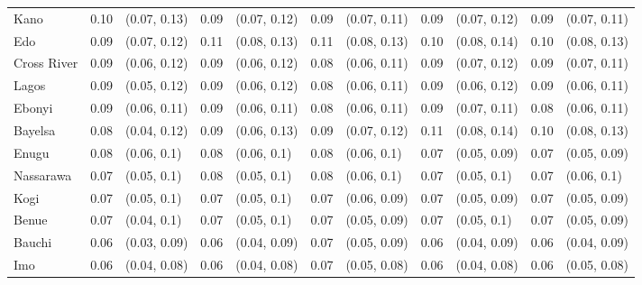 \begin{tabular}{lrlrlrlrlrl}
Kano & 0.10 & (0.07, 0.13) & 0.09 & (0.07, 0.12) & 0.09 & (0.07, 0.11) & 0.09 & (0.07, 0.12) & 0.09 & (0.07, 0.11)\\
Edo & 0.09 & (0.07, 0.12) & 0.11 & (0.08, 0.13) & 0.11 & (0.08, 0.13) & 0.10 & (0.08, 0.14) & 0.10 & (0.08, 0.13)\\
Cross River & 0.09 & (0.06, 0.12) & 0.09 & (0.06, 0.12) & 0.08 & (0.06, 0.11) & 0.09 & (0.07, 0.12) & 0.09 & (0.07, 0.11)\\
Lagos & 0.09 & (0.05, 0.12) & 0.09 & (0.06, 0.12) & 0.08 & (0.06, 0.11) & 0.09 & (0.06, 0.12) & 0.09 & (0.06, 0.11)\\
Ebonyi & 0.09 & (0.06, 0.11) & 0.09 & (0.06, 0.11) & 0.08 & (0.06, 0.11) & 0.09 & (0.07, 0.11) & 0.08 & (0.06, 0.11)\\
Bayelsa & 0.08 & (0.04, 0.12) & 0.09 & (0.06, 0.13) & 0.09 & (0.07, 0.12) & 0.11 & (0.08, 0.14) & 0.10 & (0.08, 0.13)\\
Enugu & 0.08 & (0.06, 0.1) & 0.08 & (0.06, 0.1) & 0.08 & (0.06, 0.1) & 0.07 & (0.05, 0.09) & 0.07 & (0.05, 0.09)\\
Nassarawa & 0.07 & (0.05, 0.1) & 0.08 & (0.05, 0.1) & 0.08 & (0.06, 0.1) & 0.07 & (0.05, 0.1) & 0.07 & (0.06, 0.1)\\
Kogi & 0.07 & (0.05, 0.1) & 0.07 & (0.05, 0.1) & 0.07 & (0.06, 0.09) & 0.07 & (0.05, 0.09) & 0.07 & (0.05, 0.09)\\
Benue & 0.07 & (0.04, 0.1) & 0.07 & (0.05, 0.1) & 0.07 & (0.05, 0.09) & 0.07 & (0.05, 0.1) & 0.07 & (0.05, 0.09)\\
Bauchi & 0.06 & (0.03, 0.09) & 0.06 & (0.04, 0.09) & 0.07 & (0.05, 0.09) & 0.06 & (0.04, 0.09) & 0.06 & (0.04, 0.09)\\
Imo & 0.06 & (0.04, 0.08) & 0.06 & (0.04, 0.08) & 0.07 & (0.05, 0.08) & 0.06 & (0.04, 0.08) & 0.06 & (0.05, 0.08)\\
\bottomrule
\end{tabular}
